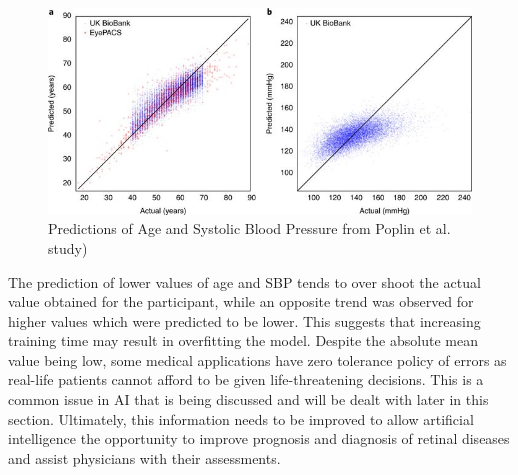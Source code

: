 \documentclass[a4paper]{article}
\begin{document}
        \begin{figure}[h!]
            \centerline{\includegraphics[width=1\textwidth]{../img/ageSBP.jpg}}
            \label{fig 3: Predictions of Age and Systolic Blood Pressure} 
            \caption{\label{fig3:}Predictions of Age and Systolic Blood Pressure from Poplin et al. study)}
        \end{figure}

        The prediction of lower values of age and SBP tends to over shoot the actual value obtained for the participant, while an opposite trend was observed for higher values which were predicted to be lower. This suggests that increasing training time may result in overfitting the model. Despite the absolute mean value being low, some medical applications have zero tolerance policy of errors as real-life patients cannot afford to be given life-threatening decisions. This is a common issue in AI that is being discussed and will be dealt with later in this section. Ultimately, this information needs to be improved to allow artificial intelligence the opportunity to improve prognosis and diagnosis of retinal diseases and assist physicians with their assessments.
        \vspace{3mm}
\end{document}
